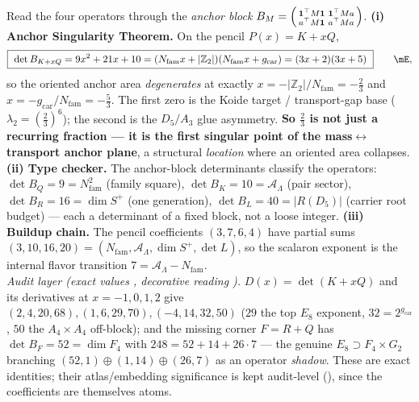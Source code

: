 \documentclass[11pt,a4paper]{article}
\newcommand{\gcar}{g_{\mathrm{car}}}
\newcommand{\Nfam}{N_{\mathrm{fam}}}
\newcommand{\AL}{\mathcal A_\Lambda}
\newcommand{\Z}{\mathbb{Z}}
\theoremstyle{definition}
\begin{document}
\begin{keybox}
Read the four operators through the \emph{anchor block} $B_M=\begin{psmallmatrix}\mathbf1^\top M\mathbf1&\mathbf1^\top Ma\\a^\top M\mathbf1&a^\top Ma\end{psmallmatrix}$.
\textbf{(i) Anchor Singularity Theorem.} On the pencil $P(x)=K+xQ$,
\[
  \boxed{\ \det B_{K+xQ}=9x^2+21x+10=(\Nfam x+|\Z_2|)(\Nfam x+\gcar)=(3x+2)(3x+5)\ }\qquad\mE ,
\]
so the oriented anchor area \emph{degenerates} at exactly $x=-|\Z_2|/\Nfam=-\tfrac23$ and $x=-\gcar/\Nfam=-\tfrac53$.
The first zero is the Koide target / transport-gap base ($\lambda_2=(\tfrac23)^6$); the second is the $D_5/A_3$
glue asymmetry. \textbf{So $\tfrac23$ is not just a recurring fraction --- it is the first singular point of the
mass$\leftrightarrow$transport anchor plane}, a structural \emph{location} where an oriented area collapses.
\textbf{(ii) Type checker.} The anchor-block determinants classify the operators:
$\det B_Q=9=\Nfam^2$ (family square), $\det B_K=10=\AL$ (pair sector), $\det B_R=16=\dim S^+$ (one generation),
$\det B_L=40=|R(D_5)|$ (carrier root budget) --- each a determinant of a fixed block, not a loose integer.
\textbf{(iii) Buildup chain.} The pencil coefficients $(3,7,6,4)$ have partial sums $(3,10,16,20)=(\Nfam,\AL,\dim S^+,\det L)$,
so the scalaron exponent is the internal flavor transition $7=\AL-\Nfam$.
\smallskip\\
\noindent\emph{Audit layer (exact values \mE, decorative reading \mC).} $D(x)=\det(K{+}xQ)$ and its derivatives
at $x=-1,0,1,2$ give $(2,4,20,68),(1,6,29,70),(-4,14,32,50)$ ($29$ the top $E_8$ exponent, $32=2^{\gcar}$, $50$
the $A_4{\times}A_4$ off-block); and the missing corner $F=R+Q$ has $\det B_F=52=\dim F_4$ with
$248=52+14+26\cdot7$ --- the genuine $E_8\!\supset\!F_4{\times}G_2$ branching $(52,1){\oplus}(1,14){\oplus}(26,7)$
as an operator \emph{shadow}. These are exact identities; their atlas/embedding significance is kept audit-level
(\mC), since the coefficients are themselves atoms.
\end{keybox}
\end{document}
